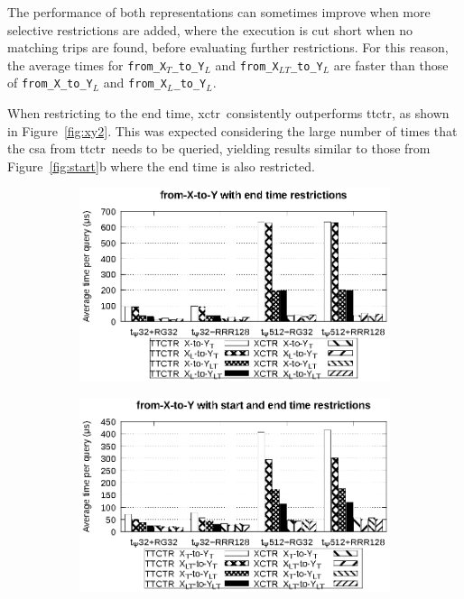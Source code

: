     The performance of both representations can sometimes improve  when more selective restrictions are added, where the execution is cut short when no matching trips are found, before evaluating further restrictions. For this reason, the average times for \texttt{from\_X$_{T}$\_to\_Y$_{L}$} and \texttt{from\_X$_{LT}$\_to\_Y$_{L}$} are faster than those of \texttt{from\_X\_to\_Y$_{L}$} and \texttt{from\_X$_{L}$\_to\_Y$_{L}$}.
    
    When restricting to the end time, \gls{xctr}~consistently outperforms \gls{ttctr}, as shown in Figure~\ref{fig:xy2}. This was expected considering the large number of times that the \gls{csa} from \gls{ttctr}~needs to be queried, yielding results similar to those from Figure~\ref{fig:start}b where the end time is also restricted.
    
    \begin{figure}[ht]
    \begin{subfigure}{0.5\linewidth}
    \includegraphics[width=\linewidth]{experiments/xy2.eps}
    \vspace{-12pt}
    \caption{}
    \vspace{-12pt}
    \end{subfigure}%
    \begin{subfigure}{0.5\linewidth}
    \includegraphics[width=\linewidth]{experiments/xy3.eps}

\end{subfigure}
\end{figure}
